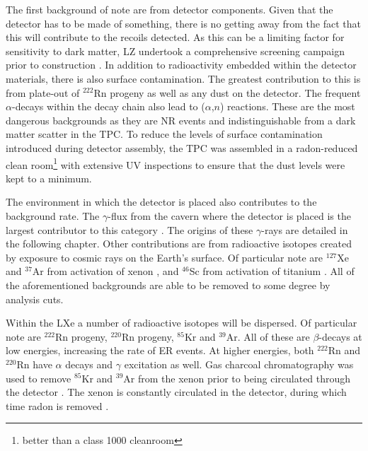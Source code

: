 \par
The first background of note are from detector components.
Given that the detector has to be made of something, there is no getting away from the fact that this will contribute to the recoils detected.
As this can be a limiting factor for sensitivity to dark matter, LZ undertook a comprehensive screening campaign prior to construction \cite{LZ_assay_ref}.
In addition to radioactivity embedded within the detector materials, there is also surface contamination.
The greatest contribution to this is from plate-out of ${}^{222}$Rn progeny as well as any dust on the detector.
The frequent $\alpha$-decays within the decay chain also lead to ($\alpha$,$n$) reactions.
These are the most dangerous backgrounds as they are NR events and indistinguishable from a dark matter scatter in the TPC.
To reduce the levels of surface contamination introduced during detector assembly, the TPC was assembled in a radon-reduced clean room\footnote{better than a class 1000 cleanroom} with extensive UV inspections to ensure that the dust levels were kept to a minimum.

\par
The environment in which the detector is placed also contributes to the background rate.
The $\gamma$-flux from the cavern where the detector is placed is the largest contributor to this category \cite{LZ_Gamma_Ray_Background_ref}.
The origins of these $\gamma$-rays are detailed in the following chapter.
Other contributions are from radioactive isotopes created by exposure to cosmic rays on the Earth's surface.
Of particular note are $^{127}$Xe and ${}^{37}$Ar from activation of xenon \cite{lux_xenon_activation_ref,lz_argon37_ref}, and $^{46}$Sc from activation of titanium \cite{LZ_TechnicalDesignReview_ref}.
All of the aforementioned backgrounds are able to be removed to some degree by analysis cuts.

\par
Within the LXe a number of radioactive isotopes will be dispersed.
Of particular note are $^{222}$Rn progeny, $^{220}$Rn progeny, $^{85}$Kr and $^{39}$Ar.
All of these are $\beta$-decays at low energies, increasing the rate of ER events.
At higher energies, both $^{222}$Rn and $^{220}$Rn have $\alpha$ decays and $\gamma$ excitation as well.
Gas charcoal chromatography was used to remove $^{85}$Kr and $^{39}$Ar from the xenon prior to being circulated through the detector \cite{xenon_prufication_chromatography_ref}.
The xenon is constantly circulated in the detector, during which time radon is removed \cite{marisarthurs_thesis_ref}.

